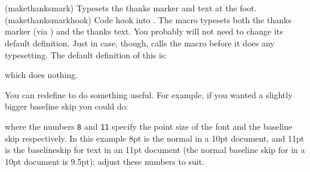 \begin{comment}
\item Setting \verb?\thanksfootextra{ }? and \verb?\thanksscript{#1}? 
      right justifies the baseline mark and a space in the mark box:
   \begin{itemize}
   \item The normal style is
         defined by \verb?\thanksmarkwidth{1.8em}? and \\
         \verb?\thanksmargin{-\thanksmarkwidth}? which put the mark 
         indented and the text left adjusted, like a normal indented
         paragraph\index{paragraph!indentation}.
   \item \verb?\thanksmarkwidth{1.8em}? and
         \verb?\thanksmargin{0em}? put the mark indented 
         and the text indented and aligned.
   \end{itemize}

\end{itemize}

\end{comment}

\begin{syntax}
\cmd{\makethanksmark} \\
\cmd{\makethanksmarkhook} \\
\end{syntax}
\glossary(makethanksmark)%
  {}%
  {Typesets the thanks marker and text at the foot.}
\glossary(makethanksmarkhook)
  {}
  {Code hook into .}
The macro \cmd{\makethanksmark} typesets both the thanks marker (via
\cmd{\thanksfootmark}) and the thanks text. You probably will not need
to change its default definition. Just in case, though, 
\cmd{\makethanksmark}
calls the macro \cmd{\makethanksmarkhook} before it does any typesetting.
The default definition of this is: 
\begin{lcode}
\newcommand{\makethanksmarkhook}{}
\end{lcode}
which does nothing.

   You can redefine \cmd{\makethanksmarkhook} to do something useful. For
example, if you wanted a slightly bigger baseline skip you could do:
\begin{lcode}
\renewcommand{\makethanksmarkhook}{\fontsize{8}{11}\selectfont}
\end{lcode}
where the numbers \texttt{8} and \texttt{11} specify the point size of the font 
and the baseline skip
respectively. In this example 8pt is the normal \cmd{\footnotesize} in
a 10pt document, and 11pt is the baselineskip for \cmd{\footnotesize}
text in an 11pt document (the normal baseline skip for \cmd{\footnotesize}
in a 10pt document is 9.5pt);
adjust these numbers to suit.

